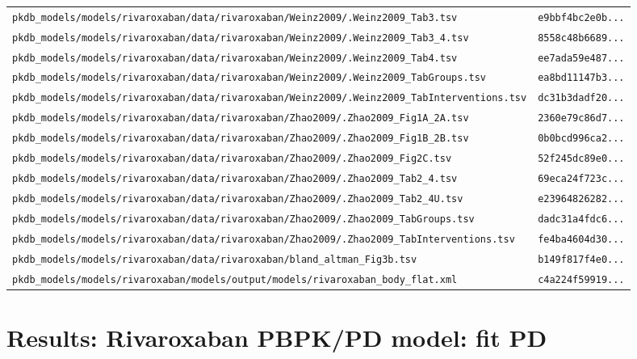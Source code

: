 \documentclass{article}
\begin{document}
\begin{longtable}{ll}
\texttt{pkdb\_models/models/rivaroxaban/data/rivaroxaban/Weinz2009/.Weinz2009\_Tab3.tsv} & \texttt{e9bbf4bc2e0b...} \\
\texttt{pkdb\_models/models/rivaroxaban/data/rivaroxaban/Weinz2009/.Weinz2009\_Tab3\_4.tsv} & \texttt{8558c48b6689...} \\
\texttt{pkdb\_models/models/rivaroxaban/data/rivaroxaban/Weinz2009/.Weinz2009\_Tab4.tsv} & \texttt{ee7ada59e487...} \\
\texttt{pkdb\_models/models/rivaroxaban/data/rivaroxaban/Weinz2009/.Weinz2009\_TabGroups.tsv} & \texttt{ea8bd11147b3...} \\
\texttt{pkdb\_models/models/rivaroxaban/data/rivaroxaban/Weinz2009/.Weinz2009\_TabInterventions.tsv} & \texttt{dc31b3dadf20...} \\
\texttt{pkdb\_models/models/rivaroxaban/data/rivaroxaban/Zhao2009/.Zhao2009\_Fig1A\_2A.tsv} & \texttt{2360e79c86d7...} \\
\texttt{pkdb\_models/models/rivaroxaban/data/rivaroxaban/Zhao2009/.Zhao2009\_Fig1B\_2B.tsv} & \texttt{0b0bcd996ca2...} \\
\texttt{pkdb\_models/models/rivaroxaban/data/rivaroxaban/Zhao2009/.Zhao2009\_Fig2C.tsv} & \texttt{52f245dc89e0...} \\
\texttt{pkdb\_models/models/rivaroxaban/data/rivaroxaban/Zhao2009/.Zhao2009\_Tab2\_4.tsv} & \texttt{69eca24f723c...} \\
\texttt{pkdb\_models/models/rivaroxaban/data/rivaroxaban/Zhao2009/.Zhao2009\_Tab2\_4U.tsv} & \texttt{e23964826282...} \\
\texttt{pkdb\_models/models/rivaroxaban/data/rivaroxaban/Zhao2009/.Zhao2009\_TabGroups.tsv} & \texttt{dadc31a4fdc6...} \\
\texttt{pkdb\_models/models/rivaroxaban/data/rivaroxaban/Zhao2009/.Zhao2009\_TabInterventions.tsv} & \texttt{fe4ba4604d30...} \\
\texttt{pkdb\_models/models/rivaroxaban/data/rivaroxaban/bland\_altman\_Fig3b.tsv} & \texttt{b149f817f4e0...} \\
\texttt{pkdb\_models/models/rivaroxaban/models/output/models/rivaroxaban\_body\_flat.xml} & \texttt{c4a224f59919...} \\
\end{longtable}

\section{Results: Rivaroxaban PBPK/PD model: fit PD}
\end{document}
